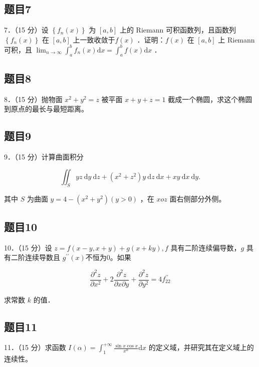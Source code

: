 \documentclass{article}
\begin{document}
\subsection{题目7}
7．（15 分）设 \(\left\{f_{n}(x)\right\}\) 为 \([a, b]\) 上的 Riemann 可积函数列，且函数列 \(\left\{f_{n}(x)\right\}\) 在 \([a, b]\) 上一致收敛于\(f(x)\) ．证明：\(f(x)\) 在 \([a, b]\) 上 Riemann 可积，且 \(\lim _{n \rightarrow \infty} \int_{a}^{b} f_{n}(x) \mathrm{d} x=\int_{a}^{b} f(x) \mathrm{d} x\) ．

\subsection{题目8}
8．（15 分）抛物面 \(x^{2}+y^{2}=z\) 被平面 \(x+y+z=1\) 截成一个椭圆，求这个椭圆到原点的最长与最短距离。

\subsection{题目9}
9．（15 分）计算曲面积分

\[
\iint_{S} y z \mathrm{~d} y \mathrm{~d} z+\left(x^{2}+z^{2}\right) y \mathrm{~d} z \mathrm{~d} x+x y \mathrm{~d} x \mathrm{~d} y .
\]

其中 \(S\) 为曲面 \(y=4-\left(x^{2}+y^{2}\right)(y>0)\) ，在 \(x o z\) 面右侧部分外侧。

\subsection{题目10}
10．（15 分）设 \(z=f(x-y, x+y)+g(x+k y), f\) 具有二阶连续偏导数，\(g\) 具有二阶连续导数且 \(g^{\prime \prime}(x)\)不恒为0。如果

\[
\frac{\partial^{2} z}{\partial x^{2}}+2 \frac{\partial^{2} z}{\partial x \partial y}+\frac{\partial^{2} z}{\partial y^{2}}=4 f_{22}^{\prime \prime}
\]

求常数 \(k\) 的值．

\subsection{题目11}
11．（15 分）求函数 \(I(\alpha)=\int_{1}^{+\infty} \frac{\sin x \cos x}{x^{\alpha}} \mathrm{d} x\) 的定义域，并研究其在定义域上的连续性。
\end{document}

